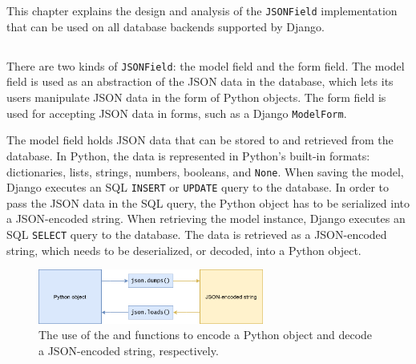 \chapter{\babTiga}

This chapter explains the design and analysis of the \verb|JSONField|
implementation that can be used on all database backends supported by Django.

\section{}

There are two kinds of \verb|JSONField|: the model field and the form field.
The model field is used as an abstraction of the JSON data in the database,
which lets its users manipulate JSON data in the form of Python objects.
The form field is used for accepting JSON data in forms, such as a Django
\verb|ModelForm|.

The model field holds JSON data that can be stored to and retrieved from the
database. In Python, the data is represented in Python's built-in formats:
dictionaries, lists, strings, numbers, booleans, and \verb|None|. When saving
the model, Django executes an SQL \verb|INSERT| or \verb|UPDATE| query to the
database. In order to pass the JSON data in the SQL query, the Python object
has to be serialized into a JSON-encoded string. When retrieving the model
instance, Django executes an SQL \verb|SELECT| query to the database. The data
is retrieved as a JSON-encoded string, which needs to be deserialized, or
decoded, into a Python object.

\begin{figure}
	\centering
    \includegraphics[width=0.66\textwidth]{pics/encodecode.png}
	\caption{The use of the  and 
	functions to encode a Python object and decode a JSON-encoded string,
	respectively.}
	\label{fig:encodecode}
\end{figure}

